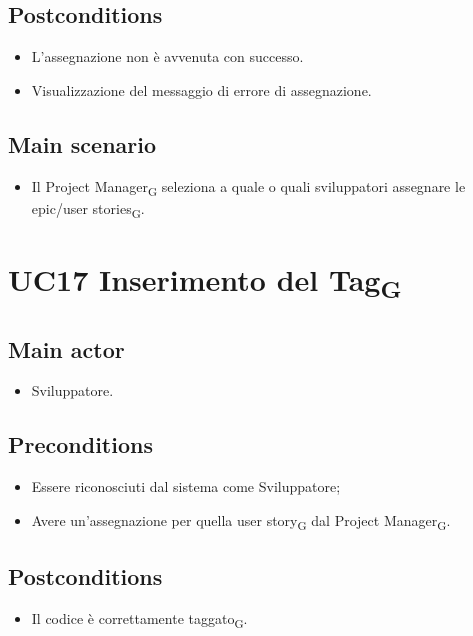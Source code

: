 \documentclass{article}
\begin{document}
    \subsection*{Postconditions}
        \begin{itemize}
            \item L'assegnazione non è avvenuta con successo.
            \item Visualizzazione del messaggio di errore di assegnazione.
        \end{itemize}

    \subsection*{Main scenario}
    \begin{itemize}
        \item Il Project Manager\textsubscript{G} seleziona a quale o quali sviluppatori assegnare le epic/user stories\textsubscript{G}.
    \end{itemize}

\section{UC17 Inserimento del Tag\textsubscript{G}}
\subsection*{Main actor}
        \begin{itemize}
            \item Sviluppatore.
        \end{itemize}
    
    \subsection*{Preconditions}
        \begin{itemize}
            \item Essere riconosciuti dal sistema come Sviluppatore;
            \item Avere un'assegnazione per quella user story\textsubscript{G} dal Project Manager\textsubscript{G}.
        \end{itemize}
        
    \subsection*{Postconditions} 
        \begin{itemize}
            \item Il codice è correttamente taggato\textsubscript{G}.
        \end{itemize}
\end{document}
